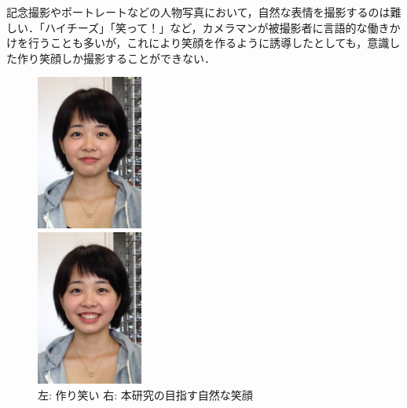 \documentclass[submit,techreq]{ec2014}
\begin{document}
記念撮影やポートレートなどの人物写真において，自然な表情を撮影するのは難しい．「ハイチーズ」「笑って！」など，カメラマンが被撮影者に言語的な働きかけを行うことも多いが，これにより笑顔を作るように誘導したとしても，意識した作り笑顔しか撮影することができない．




\begin{figure}[b!]
\begin{minipage}{0.49\columnwidth}
\begin{center}
\includegraphics[width=35mm, bb=0 0 572 834]{images/cap_28.jpg}
\end{center}
\end{minipage}
\begin{minipage}{0.49\columnwidth}
\begin{center}
\includegraphics[width=35mm, bb=0 0 572 834]{images/cap_123.jpg}
\end{center}
\end{minipage}
\label{hirashimasmile}
\begin{center}
\caption{左: 作り笑い 右: 本研究の目指す自然な笑顔}

\end{center}
\end{figure}
\end{document}
